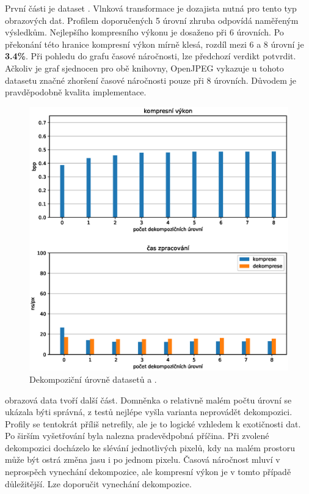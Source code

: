 \noindent První části je dataset . Vlnková transformace je dozajista nutná pro tento typ obrazových dat. Profilem doporučených 5 úrovní zhruba odpovídá naměřeným výsledkům. Nejlepšího kompresního výkonu je dosaženo při 6 úrovních. Po překonání této hranice kompresní výkon mírně klesá, rozdíl mezi 6 a 8 úrovní je \textbf{3.4\%}. Při pohledu do grafu časové náročnosti, lze předchozí verdikt potvrdit. Ačkoliv je graf sjednocen pro obě knihovny, OpenJPEG vykazuje u tohoto datasetu značné zhoršení časové náročnosti pouze při 8 úrovních. Důvodem je pravděpodobně kvalita implementace.

\begin{figure}[hbt!]
  \centering
  \hspace*{-0.75cm}
  \includegraphics[width=16cm]{obrazky-figures/levels/bitonal_levels.eps}
  \caption{Dekompoziční úrovně datasetů  a .}
\end{figure}

\noindent {} obrazová data tvoří další část. Domněnka o relativně malém počtu úrovní se ukázala býti správná, z testů nejlépe vyšla varianta neprovádět dekompozici. Profily se tentokrát příliš netrefily, ale je to logické vzhledem k exotičnosti dat. Po širším vyšetřování byla nalezna pradevědpobná příčina. Při zvolené dekompozici docházelo ke slévání jednotlivých pixelů, kdy na malém prostoru může být ostrá změna jasu i po jednom pixelu. Časová náročnost mluví v neprospěch vynechání dekompozice, ale kompresní výkon je v tomto případě důležitější. Lze doporučit vynechání dekompozice.


